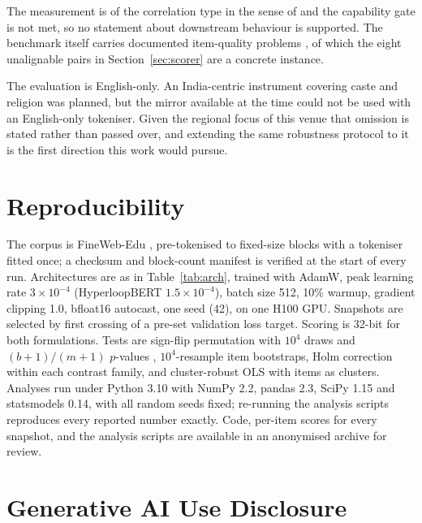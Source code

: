 \documentclass[sigconf,natbib=true,anonymous=true]{acmart}
\begin{document}
The measurement is of the correlation type in the sense of
\citet{wang2025difference} and the capability gate is not met, so no statement
about downstream behaviour is supported. The benchmark itself carries documented
item-quality problems \citep{blodgett2021salmon}, of which the eight unalignable
pairs in Section~\ref{sec:scorer} are a concrete instance.

The evaluation is English-only. An India-centric instrument covering caste and
religion \citep{khandelwal2023indianbhed} was planned, but the mirror available
at the time could not be used with an English-only tokeniser. Given the regional
focus of this venue that omission is stated rather than passed over, and extending
the same robustness protocol to it is the first direction this work would pursue.

\section{Reproducibility}

The corpus is FineWeb-Edu \citep{penedo2024fineweb}, pre-tokenised to fixed-size
blocks with a tokeniser fitted once; a checksum and block-count manifest is
verified at the start of every run. Architectures are as in Table~\ref{tab:arch},
trained with AdamW, peak learning rate $3 \times 10^{-4}$ (HyperloopBERT
$1.5 \times 10^{-4}$), batch size 512, 10\% warmup, gradient clipping 1.0,
bfloat16 autocast, one seed (42), on one H100 GPU. Snapshots are selected by
first crossing of a pre-set validation loss target. Scoring is 32-bit for both
formulations. Tests are sign-flip permutation with $10^4$ draws and
$(b+1)/(m+1)$ $p$-values \citep{phipson2010permutation}, $10^4$-resample item
bootstraps, Holm correction within each contrast family, and cluster-robust OLS
with items as clusters. Analyses run under Python 3.10 with NumPy 2.2, pandas
2.3, SciPy 1.15 and statsmodels 0.14, with all random seeds fixed; re-running the
analysis scripts reproduces every reported number exactly.
Code, per-item scores for every snapshot, and the analysis scripts are available
in an anonymised archive for review.

\section*{Generative AI Use Disclosure}
\end{document}
